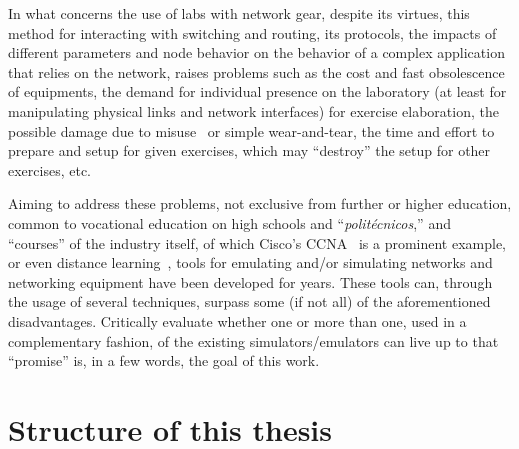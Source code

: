 In what concerns the use of labs with network gear, despite its virtues, this method for interacting with switching and routing, its protocols, the impacts of different parameters and node behavior on the behavior of a complex application that relies on the network, raises problems such as the cost and fast obsolescence~\cite{automaticnetconfiggns} of equipments, the demand for individual presence on the laboratory (at least for manipulating physical links and network interfaces) for exercise elaboration, the possible damage due to misuse~\cite{teachinginovation} or simple wear-and-tear, the time and effort to prepare and setup for given exercises, which may ``destroy'' the setup for other exercises, etc. %

Aiming to address these problems, not exclusive from further or higher education, common to vocational education on high schools and ``\emph{politécnicos},'' and ``courses'' of the industry itself, of which Cisco's CCNA~\cite{ccna} is a prominent example, or even distance learning~\cite{networkvirtwithgns}, tools for emulating and/or simulating networks and networking equipment have been developed for years. %
These tools can, through the usage of several techniques, surpass some (if not all) of the aforementioned disadvantages.
Critically evaluate whether one or more than one, used in a complementary fashion, of the existing simulators/emulators can live up to that ``promise'' is, in a few words, the goal of this work.

\section{Structure of this thesis}
\label{sec:structure}

